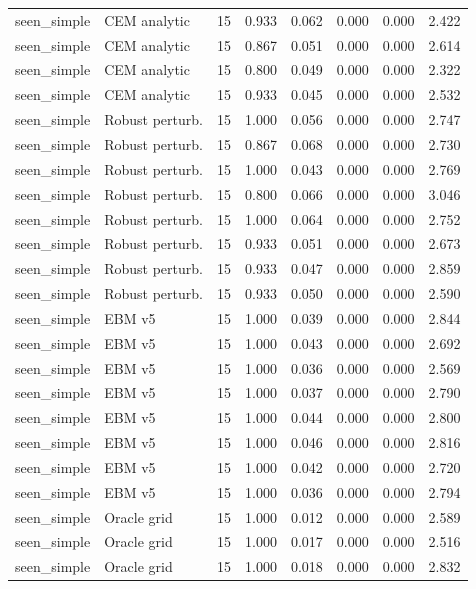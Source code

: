 {\begin{longtable}{llrrrrrr}
seen\_simple & CEM analytic & 15 & 0.933 & 0.062 & 0.000 & 0.000 & 2.422 \\
seen\_simple & CEM analytic & 15 & 0.867 & 0.051 & 0.000 & 0.000 & 2.614 \\
seen\_simple & CEM analytic & 15 & 0.800 & 0.049 & 0.000 & 0.000 & 2.322 \\
seen\_simple & CEM analytic & 15 & 0.933 & 0.045 & 0.000 & 0.000 & 2.532 \\
seen\_simple & Robust perturb. & 15 & 1.000 & 0.056 & 0.000 & 0.000 & 2.747 \\
seen\_simple & Robust perturb. & 15 & 0.867 & 0.068 & 0.000 & 0.000 & 2.730 \\
seen\_simple & Robust perturb. & 15 & 1.000 & 0.043 & 0.000 & 0.000 & 2.769 \\
seen\_simple & Robust perturb. & 15 & 0.800 & 0.066 & 0.000 & 0.000 & 3.046 \\
seen\_simple & Robust perturb. & 15 & 1.000 & 0.064 & 0.000 & 0.000 & 2.752 \\
seen\_simple & Robust perturb. & 15 & 0.933 & 0.051 & 0.000 & 0.000 & 2.673 \\
seen\_simple & Robust perturb. & 15 & 0.933 & 0.047 & 0.000 & 0.000 & 2.859 \\
seen\_simple & Robust perturb. & 15 & 0.933 & 0.050 & 0.000 & 0.000 & 2.590 \\
seen\_simple & EBM v5 & 15 & 1.000 & 0.039 & 0.000 & 0.000 & 2.844 \\
seen\_simple & EBM v5 & 15 & 1.000 & 0.043 & 0.000 & 0.000 & 2.692 \\
seen\_simple & EBM v5 & 15 & 1.000 & 0.036 & 0.000 & 0.000 & 2.569 \\
seen\_simple & EBM v5 & 15 & 1.000 & 0.037 & 0.000 & 0.000 & 2.790 \\
seen\_simple & EBM v5 & 15 & 1.000 & 0.044 & 0.000 & 0.000 & 2.800 \\
seen\_simple & EBM v5 & 15 & 1.000 & 0.046 & 0.000 & 0.000 & 2.816 \\
seen\_simple & EBM v5 & 15 & 1.000 & 0.042 & 0.000 & 0.000 & 2.720 \\
seen\_simple & EBM v5 & 15 & 1.000 & 0.036 & 0.000 & 0.000 & 2.794 \\
seen\_simple & Oracle grid & 15 & 1.000 & 0.012 & 0.000 & 0.000 & 2.589 \\
seen\_simple & Oracle grid & 15 & 1.000 & 0.017 & 0.000 & 0.000 & 2.516 \\
seen\_simple & Oracle grid & 15 & 1.000 & 0.018 & 0.000 & 0.000 & 2.832 \\

\end{longtable}}
